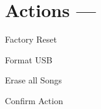 \section{Actions --- }

Factory Reset


Format USB

Erase all Songs














































Confirm Action
